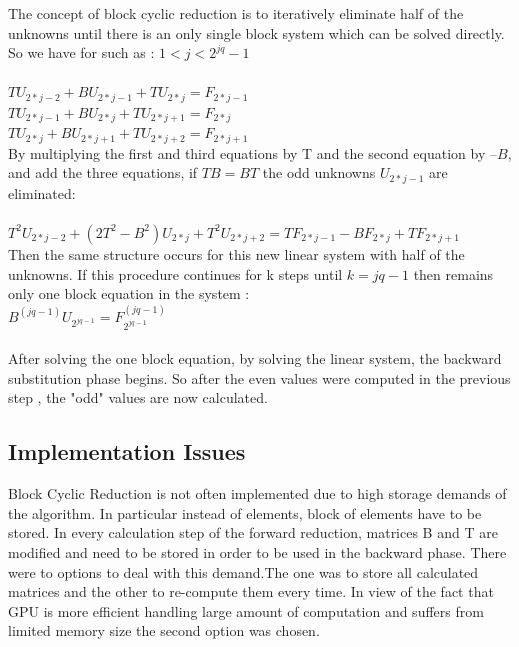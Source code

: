 The concept of block cyclic reduction is to iteratively eliminate half of the unknowns until there is an only single block system which can be solved directly.
So we have for such as : $1 < j < 2^{jq} -1$\\\\
$TU_{2*j-2} + BU_{2*j-1}+ TU_{2*j} = F_{2*j-1}$ \\
\hspace*{1cm} $TU_{2*j-1} + BU_{2*j}+ TU_{2*j+1} = F_{2*j}$ \\
\hspace*{2cm}$TU_{2*j} + BU_{2*j+1}+ TU_{2*j+2} = F_{2*j+1}$\\

By multiplying the first and third equations by T and the second equation by $–B$, and add the three equations, if $TB = BT$  the odd unknowns $U_{2*j-1}$ are eliminated:\\\\
$T^2U_{2*j-2} + (2T^2 - B^2)U_{2*j} + T^2U_{2*j+2} = TF_{2*j-1} -BF_{2*j} + TF_{2*j+1}$
\\

Then the same structure occurs for this new linear system with half of the unknowns. If this procedure continues for k steps until $k = jq-1$ then remains only one block equation in the system :\\
$B^{(jq-1)}U_{2^{jq-1}} = F^{(jq-1)}_{2^{jq-1}}$\\\\

After solving the one block equation, by solving the linear system, the backward substitution phase begins. So after the even values were computed in the previous step , the "odd" values are now calculated.
\subsection{Implementation Issues}
Block Cyclic Reduction is not often implemented due to high storage demands of the algorithm. In particular instead of elements, block of elements have to be stored. In every calculation step of the forward reduction, matrices B and T are modified and need to be stored in order to be used in the backward phase. 
There were to options to deal with this demand.The one was to store all calculated matrices and the other to re-compute them every time. In view of the fact that GPU is more efficient handling large amount of computation and suffers from limited memory size the second option was chosen.\\

